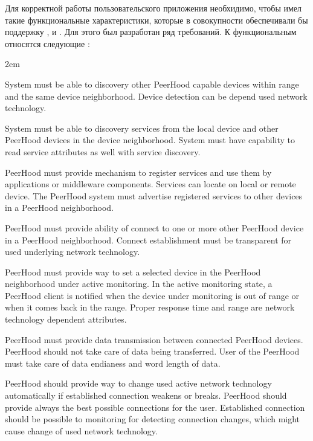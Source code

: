 \Sentence
Для корректной работы пользовательского приложения необхидимо, чтобы \PeerHood имел такие 
функциональные характеристики, которые в совокупности обеспечивали бы поддержку 
,  и 
.
\Sentence
Для этого был разработан ряд требований.
\Sentence
К функциональным относятся следующие  
:
\begin{description}
	\leftskip2em%
	\setlength{\itemsep}{0pt}%
	\setlength{\parsep}{0pt}%

	\item[Device discovery] System must be able to discovery other PeerHood capable devices 
		within range and the same device neighborhood.
		\Sentence
		Device detection can be depend used network technology.
		\item[Service discovery] System must be able to discovery services from the local device 
		and other PeerHood devices in the device neighborhood.
		\Sentence
		System must have capability to read service attributes as well with service discovery.

	\item[Service sharing] PeerHood must provide mechanism to register services and use them by 
	applications or middleware components. 
	\Sentence
	Services can locate on local or remote device. 
	\Sentence
	The PeerHood system must advertise registered services to other devices in a PeerHood 
	neighborhood.

	\item[Connection establishment] PeerHood must provide ability of connect to one or more other 
	PeerHood device in a PeerHood neighborhood. 
	\Sentence
	Connect establishment must be transparent for used underlying network technology.

	\item[Active monitoring of a device] PeerHood must provide way to set a selected device in the 
	PeerHood neighborhood under active monitoring. 
	\Sentence
	In the active monitoring state, a PeerHood client is notified when the device under monitoring 
	is out of range or when it comes back in the range. 
	\Sentence
	Proper response time and range are network technology dependent attributes.

	\item[Data transmission between devices] PeerHood must provide data transmission between 
	connected PeerHood devices. 
	\Sentence
	PeerHood should not take care of data being transferred. 
	\Sentence
	User of the PeerHood must take care of data endianess and word length of data.

	\item[Seamless connectivity] PeerHood should provide way to change used active network 
	technology automatically if established connection weakens or breaks. 
	\Sentence
	PeerHood should provide always the best possible connections for the user. 
	\Sentence
	Established connection should be possible to monitoring for detecting connection changes, which 
	might cause change of used network technology.
\end{description}


